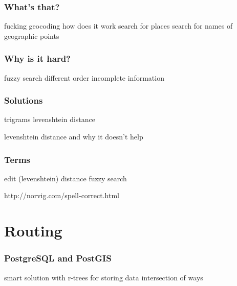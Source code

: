\documentclass{beamer}
\begin{document}
\begin{frame}
  \frametitle{What's that?}
  fucking geocoding how does it work
  search for places
  search for names of geographic points
\end{frame}

\begin{frame}
  \frametitle{Why is it hard?}
  fuzzy search
  different order
  incomplete information
\end{frame}

\begin{frame}
  \frametitle{Solutions}
  trigrams
  levenshtein distance
\end{frame}

\begin{frame}
  levenshtein distance and why it doesn't help
\end{frame}

\begin{frame}
  \frametitle{Terms}
  edit (levenshtein) distance
  fuzzy search
\end{frame}



http://norvig.com/spell-correct.html







\section{Routing}

\begin{frame}
  \frametitle{PostgreSQL and PostGIS}

\end{frame}

\begin{frame}
  smart solution with r-trees for storing data
  intersection of ways
\end{frame}










\end{document}
